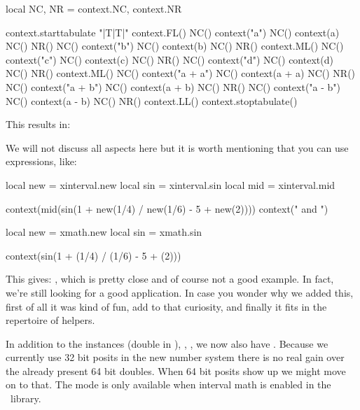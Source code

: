     local NC, NR = context.NC, context.NR

    context.starttabulate { "|T|T|" }
        context.FL()
        NC() context("a")     NC() context(a)     NC() NR()
        NC() context("b")     NC() context(b)     NC() NR()
        context.ML()
        NC() context("c")     NC() context(c)     NC() NR()
        NC() context("d")     NC() context(d)     NC() NR()
        context.ML()
        NC() context("a + a") NC() context(a + a) NC() NR()
        NC() context("a + b") NC() context(a + b) NC() NR()
        NC() context("a - b") NC() context(a - b) NC() NR()
        context.LL()
    context.stoptabulate()
\stopluacode
\stopbuffer

\typebuffer

This results in:

\getbuffer

We will not discuss all aspects here but it is worth mentioning that you can use
expressions, like:

\startbuffer
\startluacode
    local new = xinterval.new
    local sin = xinterval.sin
    local mid = xinterval.mid

    context(mid(sin(1 + new(1/4) / new(1/6) - 5 + new(2))))
    context(" and ")

    local new = xmath.new
    local sin = xmath.sin

    context(sin(1 + (1/4) / (1/6) - 5 + (2)))
\stopluacode
\stopbuffer

\typebuffer

This gives: \inlinebuffer, which is pretty close and of course not a good
example. In fact, we're still looking for a good application. In case you
wonder why we added this, first of all it was kind of fun, add to that
curiosity, and finally it fits in the repertoire of helpers.

\stopsectionlevel

\startsectionlevel[title=\METAPOST]

In addition to the instances  (double in \LMTX), ,
,  we now also have . Because we
currently use 32 bit posits in the new number system there is no real gain over
the already present 64 bit doubles. When 64 bit posits show up we might move on
to that. The  mode is only available when interval math is
enabled in the \METAPOST\ library.

\stopsectionlevel

\startsectionlevel[title=\LUA]

